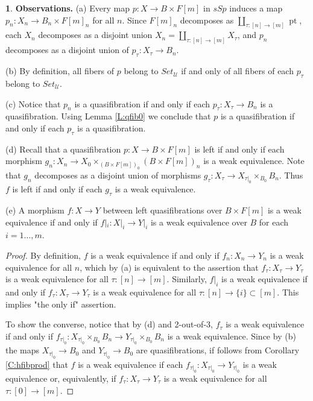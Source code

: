 \documentclass[12pt]{amsart}
\theoremstyle{plain}
\theoremstyle{definition}
\newtheorem{Emp}[Thm]{}
\numberwithin{equation}{section}
\newcommand{\cal}[1]{\mathcal{#1}}
\newcommand{\C}[1]{\cal#1}
\newcommand{\rl}[1]{Lemma \ref{L:#1}}
\newcommand{\rco}[1]{Corollary \ref{C:#1}}
\newcommand{\pt}{\operatorname{pt}}
\begin{document}
\begin{Emp} \label{E:fn}
{\bf Observations.}  (a) Every map $p:X\to B\times F[m]$ in $sSp$
induces a map $p_n:X_n\to B_n\times F[m]_n$ for all $n$. Since
$F[m]_n$ decomposes as $\coprod_{\tau:[n]\to[m]}\pt$,
each $X_n$ decomposes as a disjoint union
$X_n=\coprod_{\tau:[n]\to[m]}X_{\tau}$, and $p_n$ decomposes as a
disjoint union of $p_{\tau}:X_{\tau}\to B_n$.

(b) By definition, all fibers of $p$ belong to $Set_{\C{U}}$ if
and only of all fibers of each $p_{\tau}$ belong to $Set_{\C{U}}$.

(c) Notice that $p_n$ is a quasifibration if and only if each
$p_{\tau}:X_{\tau}\to B_n$ is a quasifibration. Using \rl{qfib0}
we conclude that $p$ is a quasifibration if and only if each
$p_{\tau}$ is a quasifibration.

(d) Recall that a quasifibration  $p:X\to B\times F[m]$ is left if
and only if each morphism  $g_n:X_n\to X_0\times_{(B\times
F[m])_0}(B\times F[m])_n$ is a weak equivalence. Note that $g_n$
decomposes as a disjoint union of morphisms $g_{\tau}:X_{\tau}\to
X_{\tau|_0}\times_{B_0}B_n$. Thus $f$ is left if and only if each
$g_{\tau}$ is a weak equivalence.

(e) A morphism $f:X\to Y$ between left quasifibrations over
$B\times F[m]$ is a weak equivalence if and only if $f|_i:X|_i\to
Y|_i$ is a weak equivalence over $B$ for each $i=1\ldots,m$.

\begin{proof}
By definition, $f$ is a weak equivalence if and only if
$f_n:X_n\to Y_n$ is a weak equivalence for all $n$, which by (a)
is equivalent to the assertion that $f_{\tau}:X_{\tau}\to
Y_{\tau}$ is a weak equivalence for all $\tau:[n]\to[m]$.
Similarly, $f|_i$ is a weak equivalence if and only if
$f_{\tau}:X_{\tau}\to Y_{\tau}$ is a weak equivalence for all
$\tau:[n]\to\{i\}\subset [m]$. This implies "the only if"
assertion.

To show the converse, notice that by (d) and 2-out-of-3,
$f_{\tau}$ is a weak equivalence if and only if 
$f_{\tau|_0}:X_{\tau|_0}\times_{B_0}B_n\to
Y_{\tau|_0}\times_{B_0}B_n$ is a weak equivalence. Since by (b)
the maps $X_{\tau|_0}\to B_0$ and $Y_{\tau|_0}\to B_0$ are
quasifibrations, if follows from \rco{hfibprod} that $f$ is a weak
equivalence if each $f_{\tau|_0}:X_{\tau|_0}\to Y_{\tau|_0}$ is a
weak equivalence or, equivalently, if $f_{\tau}:X_{\tau}\to
Y_{\tau}$ is a weak equivalence for all $\tau:[0]\to[m]$.
\end{proof}
\end{Emp}
\end{document}
